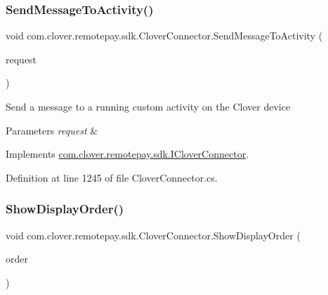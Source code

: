 \subsubsection{\texorpdfstring{Send\+Message\+To\+Activity()}{SendMessageToActivity()}}
{\footnotesize\ttfamily void com.\+clover.\+remotepay.\+sdk.\+Clover\+Connector.\+Send\+Message\+To\+Activity (\begin{DoxyParamCaption}\item[{\hyperlink{classcom_1_1clover_1_1remotepay_1_1sdk_1_1_message_to_activity}{Message\+To\+Activity}}]{request }\end{DoxyParamCaption})}



Send a message to a running custom activity on the Clover device 


\begin{DoxyParams}{Parameters}
{\em request} & \\
\hline
\end{DoxyParams}


Implements \hyperlink{interfacecom_1_1clover_1_1remotepay_1_1sdk_1_1_i_clover_connector_ad6e241f6dac22bafa5edcc89457c99a7}{com.\+clover.\+remotepay.\+sdk.\+I\+Clover\+Connector}.



Definition at line 1245 of file Clover\+Connector.\+cs.

\mbox{\label{classcom_1_1clover_1_1remotepay_1_1sdk_1_1_clover_connector_abfa384bfc0c016908d137e0332b7e06c}} 
\subsubsection{\texorpdfstring{Show\+Display\+Order()}{ShowDisplayOrder()}}
{\footnotesize\ttfamily void com.\+clover.\+remotepay.\+sdk.\+Clover\+Connector.\+Show\+Display\+Order (\begin{DoxyParamCaption}\item[{\hyperlink{classcom_1_1clover_1_1remote_1_1order_1_1_display_order}{Display\+Order}}]{order }\end{DoxyParamCaption})}



